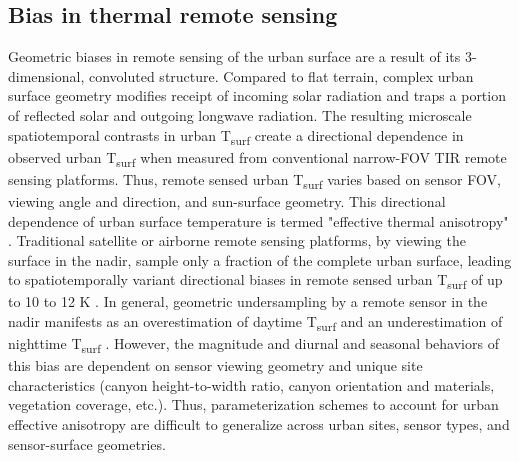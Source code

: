 \begin{bibunit}
\subsection{Bias in thermal remote sensing}
Geometric biases in remote sensing of the urban surface are a result of its 3-dimensional, convoluted structure. Compared to flat terrain, complex urban surface geometry modifies receipt of incoming solar radiation and traps a portion of reflected solar and outgoing longwave radiation. The resulting microscale spatiotemporal contrasts in urban T\textsubscript{surf} create a directional dependence in observed urban T\textsubscript{surf} when measured from conventional narrow-FOV TIR remote sensing platforms. Thus, remote sensed urban T\textsubscript{surf} varies based on sensor FOV, viewing angle and direction, and sun-surface geometry. This directional dependence of urban surface temperature is termed "effective thermal anisotropy" \citep{Voogt1998a}. Traditional satellite or airborne remote sensing platforms, by viewing the surface in the nadir, sample only a fraction of the complete urban surface, leading to spatiotemporally variant directional biases in remote sensed urban T\textsubscript{surf} of up to 10 to 12 \si{\kelvin} \citep{Voogt1995,Lagouarde2012}. In general, geometric undersampling by a remote sensor in the nadir manifests as an overestimation of daytime T\textsubscript{surf} and an underestimation of nighttime T\textsubscript{surf} \citep{Adderley2015}. However, the magnitude and diurnal and seasonal behaviors of this bias are dependent on sensor viewing geometry and unique site characteristics (canyon height-to-width ratio, canyon orientation and materials, vegetation coverage, etc.). Thus, parameterization schemes to account for urban effective anisotropy are difficult to generalize across urban sites, sensor types, and sensor-surface geometries.


\end{bibunit}
